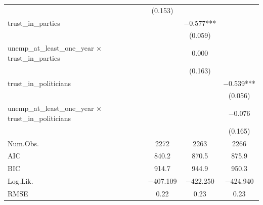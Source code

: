 \documentclass[
]{article}
\begin{document}
\begin{table}
\begin{tabular}[t]{lccc}
 & (\num{0.153}) &  & \\
trust\_in\_parties &  & \num{-0.577}*** & \\
 &  & (\num{0.059}) & \\
unemp\_at\_least\_one\_year × trust\_in\_parties &  & \num{0.000} & \\
 &  & (\num{0.163}) & \\
trust\_in\_politicians &  &  & \num{-0.539}***\\
 &  &  & (\num{0.056})\\
unemp\_at\_least\_one\_year × trust\_in\_politicians &  &  & \num{-0.076}\\
 &  &  & (\num{0.165})\\
\midrule
Num.Obs. & \num{2272} & \num{2263} & \num{2266}\\
AIC & \num{840.2} & \num{870.5} & \num{875.9}\\
BIC & \num{914.7} & \num{944.9} & \num{950.3}\\
Log.Lik. & \num{-407.109} & \num{-422.250} & \num{-424.940}\\
RMSE & \num{0.22} & \num{0.23} & \num{0.23}\\
\bottomrule
\end{tabular}
\end{table}
\end{document}
